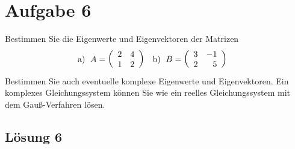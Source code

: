 \documentclass[main.tex]{subfiles}
\begin{document}
\section{Aufgabe 6}
Bestimmen Sie die Eigenwerte und Eigenvektoren der Matrizen
\begin{align*}
    \text{a) }\; A&=\eqmatrix{rr}{2 & 4 \\ 1 & 2}
    & \text{b) }\; B&=\eqmatrix{rr}{3 & -1 \\ 2 & 5}
\end{align*}
Bestimmen  Sie auch eventuelle komplexe Eigenwerte und Eigenvektoren. Ein komplexes Gleichungssystem können Sie wie ein reelles Gleichungssystem mit dem Gauß-Verfahren lösen.

\subsection{Lösung 6}
\end{document}
